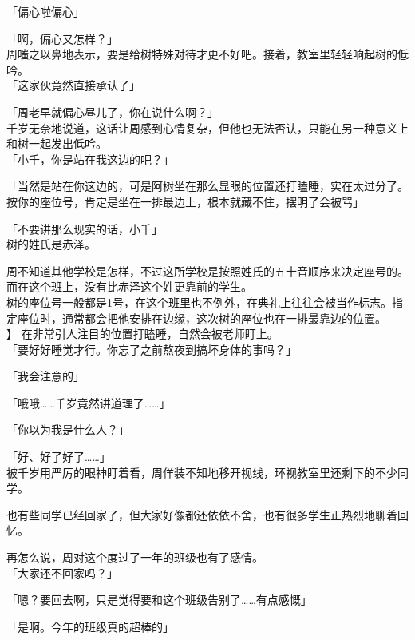 「偏心啦偏心」

「啊，偏心又怎样？」\\

周嗤之以鼻地表示，要是给树特殊对待才更不好吧。接着，教室里轻轻响起树的低吟。\\

「这家伙竟然直接承认了」

「周老早就偏心昼儿了，你在说什么啊？」\\

千岁无奈地说道，这话让周感到心情复杂，但他也无法否认，只能在另一种意义上和树一起发出低吟。\\

「小千，你是站在我这边的吧？」

「当然是站在你这边的，可是阿树坐在那么显眼的位置还打瞌睡，实在太过分了。按你的座位号，肯定是坐在一排最边上，根本就藏不住，摆明了会被骂」

「不要讲那么现实的话，小千」\\

树的姓氏是赤泽。

周不知道其他学校是怎样，不过这所学校是按照姓氏的五十音顺序来决定座号的。而在这个班上，没有比赤泽这个姓更靠前的学生。\\

树的座位号一般都是1号，在这个班里也不例外，在典礼上往往会被当作标志。指定座位时，通常都会把他安排在边缘，这次树的座位也在一排最靠边的位置。\\
】
在非常引人注目的位置打瞌睡，自然会被老师盯上。\\

「要好好睡觉才行。你忘了之前熬夜到搞坏身体的事吗？」

「我会注意的」

「哦哦……千岁竟然讲道理了……」

「你以为我是什么人？」

「好、好了好了……」\\

被千岁用严厉的眼神盯着看，周佯装不知地移开视线，环视教室里还剩下的不少同学。

也有些同学已经回家了，但大家好像都还依依不舍，也有很多学生正热烈地聊着回忆。

再怎么说，周对这个度过了一年的班级也有了感情。\\

「大家还不回家吗？」

「嗯？要回去啊，只是觉得要和这个班级告别了……有点感慨」

「是啊。今年的班级真的超棒的」\\

